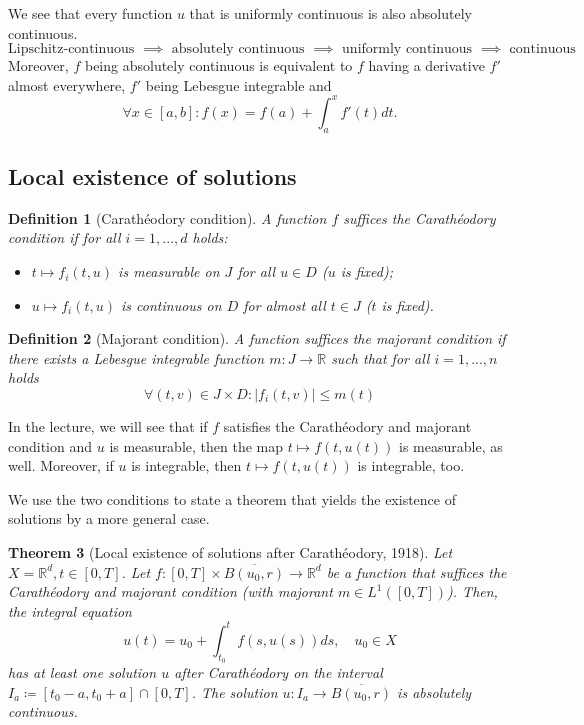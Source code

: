 \documentclass[a4paper, 11pt]{article}
\newtheorem{theorem}{Theorem}
\newtheorem{definition}[theorem]{Definition}
\begin{document}
We see that every function $u$ that is uniformly continuous is also absolutely continuous.
\[
\text{Lipschitz-continuous $\implies$ absolutely continuous $\implies$ uniformly continuous $\implies$ continuous}.
\]
Moreover, $f$ being absolutely continuous is equivalent to $f$ having a derivative $f'$ almost everywhere, $f'$ being Lebesgue integrable and
\[
\forall x \in [a,b]: f(x) = f(a) +  \int^x_a f'(t) dt.
\]

\subsection*{Local existence of solutions}
\begin{definition}[Carathéodory condition]
	A function $f$ suffices the \emph{Carathéodory condition} if for all $i=1,...,d$ holds:
	\begin{itemize}
		\item $t \mapsto f_i(t,u)$ is measurable on $J$ for all $u \in D$ ($u$ is fixed);
		\item $u \mapsto f_i(t,u)$ is continuous on $D$ for almost all $t \in J$ ($t$ is fixed).
	\end{itemize}
\end{definition}

\begin{definition}[Majorant condition]\label{majorant}
	A function suffices the \emph{majorant condition} if there exists a Lebesgue integrable function $m: J \to \mathbb R$ such that for all $i=1,...,n$ holds
	\[
	\forall (t,v) \in J \times D: |f_i(t,v)| \leq m(t)
	\]
\end{definition}

In the lecture, we will see that if $f$ satisfies the Carathéodory and majorant condition and $u$ is measurable, then the map $t \mapsto f(t,u(t))$ is measurable, as well. Moreover, if $u$ is integrable, then $t \mapsto f(t,u(t))$ is integrable, too.

We use the two conditions to state a theorem that yields the existence of solutions by a more general case.

\begin{theorem}[Local existence of solutions after Carathéodory, 1918]
	Let $X = \mathbb R^d, t \in [0,T]$. Let $f: [0,T] \times \overline{B(u_0,r)} \to \mathbb R^d$ be a function that suffices the Carathéodory and majorant condition (with majorant $m \in L^1([0,T])$). Then, the integral equation 
	\[
	u(t) = u_0 + \int^t_{t_0}f(s,u(s)) ds, \quad u_0 \in X
	\] 
	has at least one solution $u$ after Carathéodory on the interval $I_a \coloneqq [t_0-a,t_0+a] \cap [0,T]$. The solution $u: I_a \to \overline{B(u_0,r)}$ is absolutely continuous. 
\end{theorem}
\end{document}
